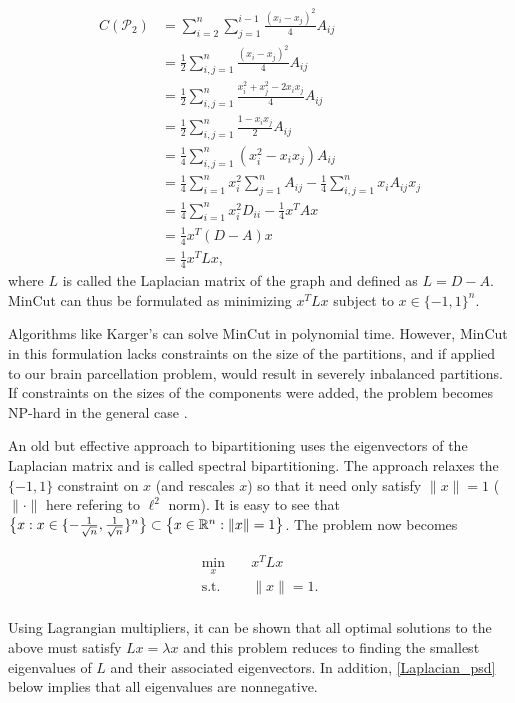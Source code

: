 \begin{align*}
C(\mathcal{P}_2)
&= \sum_{i = 2}^n \sum_{j = 1}^{i-1} \frac{(x_i - x_j)^2}{4} A_{ij} \\
&= \frac{1}{2} \sum_{i,j = 1}^n \frac{(x_i - x_j)^2}{4} A_{ij} \\
&= \frac{1}{2} \sum_{i,j = 1}^n
   \frac{x_i^2 + x_j^2 - 2 x_i x_j}{4} A_{ij} \\
&= \frac{1}{2} \sum_{i,j = 1}^n \frac{1 - x_i x_j}{2} A_{ij} \\
&= \frac{1}{4} \sum_{i,j = 1}^n (x_i^2 - x_i x_j) A_{ij} \\
&= \frac{1}{4} \sum_{i = 1}^n x_i^2 \sum_{j = 1}^n A_{ij}
 - \frac{1}{4} \sum_{i,j = 1}^n x_i A_{ij} x_j \\
&= \frac{1}{4} \sum_{i = 1}^n x_i^2 D_{ii} - \frac{1}{4} x^T A x \\
&= \frac{1}{4} x^T (D - A) x \\
&= \frac{1}{4} x^T L x,
\end{align*}
where $L$ is called the Laplacian matrix of the graph and defined as
$L = D - A$. MinCut can thus be formulated as minimizing $x^T L x$
subject to $x \in \{-1, 1\}^n$.

Algorithms like Karger's can solve MinCut in polynomial time. However,
MinCut in this formulation lacks constraints on the size of the
partitions, and if applied to our brain parcellation problem, would
result in severely inbalanced partitions. If constraints on the sizes
of the components were added, the problem becomes NP-hard in the
general case \cite{Buluc:13}.

An old but effective approach to bipartitioning uses the eigenvectors
of the Laplacian matrix and is called spectral bipartitioning.
The approach relaxes the $\{-1, 1\}$ constraint on $x$ (and rescales
$x$) so that it need only satisfy $\|x\| = 1$ ($\|\cdot\|$ here refering
to $\ell^2$ norm). It is easy to see that
$\big\{ x : x \in \{-\frac{1}{\sqrt{n}}, \frac{1}{\sqrt{n}}\}^n \big\}
 \subset \big\{ x \in \mathbb{R}^n : \|x\| = 1 \big\}$.
The problem now becomes

\begin{equation} \label{spectral_bipartition}
\begin{aligned}
\min_x      &\;& x^T L x \\
\text{s.t.} &\;& \| x \| = 1. \\
\end{aligned}
\end{equation}

Using Lagrangian multipliers, it can be shown that all optimal solutions
to the above must satisfy $L x = \lambda x$ and this problem reduces to
finding the smallest eigenvalues of $L$ and their associated
eigenvectors. In addition, \ref{Laplacian_psd} below implies that all
eigenvalues are nonnegative.

